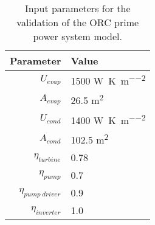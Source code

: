 \begin{table}%
	\centering
	\caption{Input parameters for the validation of the ORC prime power system model.}
	\label{tab:verification_ORC_params}
	\begin{tabular}{rl}
		\toprule
		           Parameter & Value                                        \\ \midrule
		         $U_{evap}$ & 1500 \si{\watt\per\kelvin\per\meter\squared} \\
		         $A_{evap}$ & 26.5 \si{\meter\squared}                     \\
		         $U_{cond}$ & 1400 \si{\watt\per\kelvin\per\meter\squared} \\
		         $A_{cond}$ & 102.5 \si{\meter\squared}                    \\
		    $\eta_{turbine}$ & 0.78                                         \\
		       $\eta_{pump}$ & 0.7                                          \\
		$\eta_{pump\ driver}$ & 0.9                                          \\
		   $\eta_{inverter}$ & 1.0                                          \\ \bottomrule
	\end{tabular}
\end{table}
